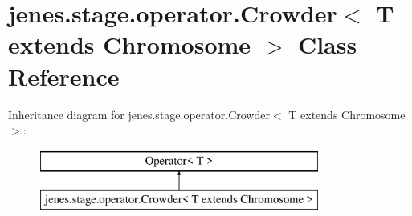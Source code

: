 \hypertarget{classjenes_1_1stage_1_1operator_1_1_crowder_3_01_t_01extends_01_chromosome_01_4}{\section{jenes.\-stage.\-operator.\-Crowder$<$ T extends Chromosome $>$ Class Reference}
\label{classjenes_1_1stage_1_1operator_1_1_crowder_3_01_t_01extends_01_chromosome_01_4}
}
Inheritance diagram for jenes.\-stage.\-operator.\-Crowder$<$ T extends Chromosome $>$\-:\begin{figure}[H]
\begin{center}
\leavevmode
\includegraphics[height=2.000000cm]{classjenes_1_1stage_1_1operator_1_1_crowder_3_01_t_01extends_01_chromosome_01_4}
\end{center}
\end{figure}
